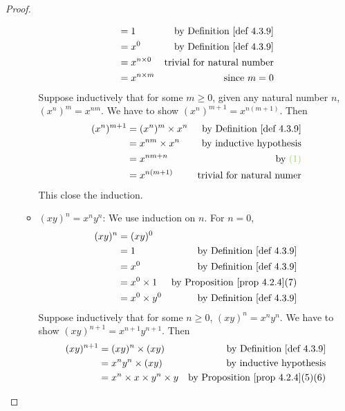 \begin{proof}
\begin{enumerate}
\begin{itemize}
\begin{align*}
                            & = 1 & \text{by \DEF{4.3.9}} \\
                            & = x^0 & \text{by \DEF{4.3.9}} \\
                            & = x^{n \X 0} & \text{trivial for natural number} \\
                            & = x^{n \X m} & \text{since \(m = 0\)}
                \end{align*}
                Suppose inductively that for some \(m \ge 0\), given any natural number \(n\), \((x^n)^m = x^{nm}\).
                We have to show \((x^n)^{m + 1} = x^{n(m + 1)}\).
                Then
                \begin{align*}
                    (x^n)^{m + 1} & = (x^n)^m \X x^n & \text{by \DEF{4.3.9}} \\
                                  & = x^{nm} \X x^n & \text{by inductive hypothesis} \\
                                  & = x^{nm + n} & \text{by \GREEN{(1)}} \\
                                  & = x^{n(m + 1)} & \text{trivial for natural numer}
                \end{align*}
                This close the induction.
            \item \((xy)^n = x^ny^n\):
                We use induction on \(n\).
                For \(n = 0\),
                \begin{align*}
                    (xy)^n & = (xy)^0 \\
                           & = 1 & \text{by \DEF{4.3.9}} \\
                           & = x^0 & \text{by \DEF{4.3.9}} \\
                           & = x^0 \X 1 & \text{by \PROP{4.2.4}(7)} \\
                           & = x^0 \X y^0 & \text{by \DEF{4.3.9}}
                \end{align*}
                Suppose inductively that for some \(n \ge 0\), \((xy)^n = x^ny^n\).
                We have to show \((xy)^{n + 1} = x^{n + 1}y^{n + 1}\).
                Then
                \begin{align*}
                    (xy)^{n + 1} & = (xy)^n \X (xy) & \text{by \DEF{4.3.9}} \\
                                 & = x^ny^n \X (xy) & \text{by inductive hypothesis} \\
                                 & = x^n \X x \X y^n \X y & \text{by \PROP{4.2.4}(5)(6)} \\

\end{align*}
\end{itemize}
\end{enumerate}
\end{proof}
